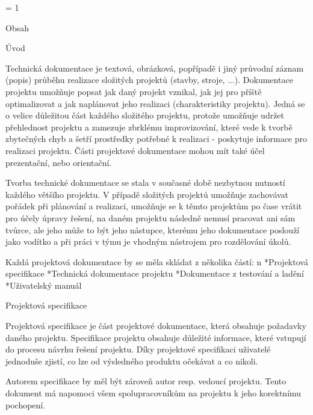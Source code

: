 



\pageno = 1

\nonum\notoc\sec Obsah

\maketoc

\vfill\break

\pagenumbers


\chap Úvod

Technická dokumentace je textová, obrázková, popřípadě i jiný průvodní záznam (popis) průběhu realizace složitých projektů (stavby, stroje, ...). Dokumentace projektu umožňuje popsat jak daný projekt vznikal, jak jej pro příště optimalizovat a jak naplánovat jeho realizaci (charakteristiky projektu). Jedná se o velice důležitou část každého složitého projektu, protože umožňuje udržet přehlednost projektu a zamezuje zbrklému improvizování, které vede k tvorbě zbytečných chyb a šetří prostředky potřebné k realizaci - poskytuje informace pro realizaci projektu. Části projektové dokumentace mohou mít také účel prezentační, nebo orientační.

Tvorba technické dokumentace se stala v současné době nezbytnou nutností každého většího projektu. V případě složitých projektů umožňuje zachovávat pořádek při plánování a realizaci, umožňuje se k těmto projektům po čase vrátit pro účely úpravy řešení, na daném projektu následně nemusí pracovat ani sám tvůrce, ale jeho může to být jeho nástupce, kterému jeho dokumentace poslouží jako vodítko a při práci v týmu je vhodným nástrojem pro rozdělování úkolů.

Každá projektová dokumentace by se měla skládat z několika částí:
\begitems\style n
*Projektová specifikace
*Technická dokumentace projektu
*Dokumentace z testování a ladění
*Uživatelský manuál
\enditems


\chap Projektová specifikace

Projektová specifikace je část projektové dokumentace, která obsahuje požadavky daného projektu. Specifikace projektu obsahuje důležité informace, které vstupují do procesu návrhu řešení projektu. Díky projektové specifikaci uživatelé jednoduše zjistí, co lze od výsledného produktu očekávat a co nikoli. 

Autorem specifikace by měl být zároveň autor resp. vedoucí projektu. Tento dokument má napomoci všem spolupracovníkům na projektu k jeho korektnímu pochopení.

